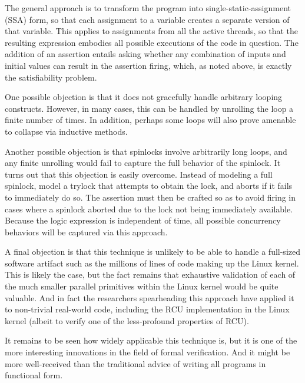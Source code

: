 The general approach is to transform the program into single-static-assignment
(SSA) form, so that each assignment to a variable creates a separate
version of that variable.
This applies to assignments from all the active threads, so that the
resulting expression embodies all possible executions of the code
in question.
The addition of an assertion entails asking whether any combination of
inputs and initial values can result in the assertion firing, which,
as noted above, is exactly the satisfiability problem.

One possible objection is that it does not gracefully handle arbitrary
looping constructs.
However, in many cases, this can be handled by unrolling the loop a
finite number of times.
In addition, perhaps some loops will also prove amenable to collapse
via inductive methods.

Another possible objection is that spinlocks involve arbitrarily long
loops, and any finite unrolling would fail to capture the full behavior
of the spinlock.
It turns out that this objection is easily overcome.
Instead of modeling a full spinlock, model a trylock that attempts to
obtain the lock, and aborts if it fails to immediately do so.
The assertion must then be crafted so as to avoid firing in cases
where a spinlock aborted due to the lock not being immediately available.
Because the logic expression is independent of time, all possible
concurrency behaviors will be captured via this approach.

A final objection is that this technique is unlikely to be able to handle
a full-sized software artifact such as the millions of lines of code making
up the Linux kernel.
This is likely the case, but the fact remains that exhaustive validation
of each of the much smaller parallel primitives within the Linux kernel
would be quite valuable.
And in fact the researchers spearheading this approach have applied it
to non-trivial real-world code, including the RCU implementation in
the Linux kernel (albeit to verify one of the less-profound properties
of RCU).

It remains to be seen how widely applicable this technique is, but
it is one of the more interesting innovations in the field of
formal verification.
And it might be more well-received than the traditional advice of
writing all programs in functional form.
